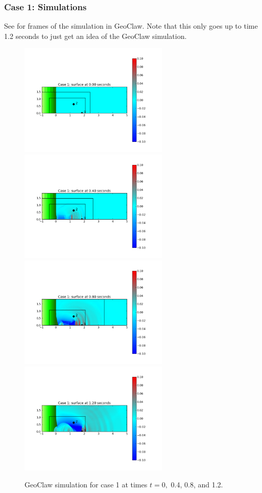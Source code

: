 \subsubsection{Case 1: Simulations}

See  for frames of the simulation in GeoClaw.  Note that
this only goes up to time 1.2 seconds to just get an idea of the GeoClaw
simulation.

\begin{figure}[ht]
\hfil\includegraphics[width=2.8in]{bp12/case1pcolor0.png}\hfil
\hfil\includegraphics[width=2.8in]{bp12/case1pcolor4.png}\hfil
\vskip 5pt
\hfil\includegraphics[width=2.8in]{bp12/case1pcolor8.png}\hfil
\hfil\includegraphics[width=2.8in]{bp12/case1pcolor12.png}\hfil
\caption{\label{fig:bp8pcolorcase1}
GeoClaw simulation for case 1 at times $t = 0,$ 0.4, 0.8, and 1.2.
  }
\end{figure}

